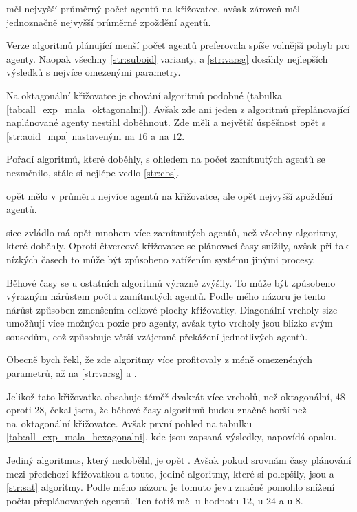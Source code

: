  měl nejvyšší průměrný počet agentů na křižovatce,
avšak zároveň měl jednoznačně nejvyšší průměrné zpoždění agentů.

Verze algoritmů plánující menší počet agentů preferovala spíše volnější pohyb pro agenty.
Naopak všechny \ref{str:suboid} varianty,  a \ref{str:varsg} dosáhly nejlepších výsledků s nejvíce omezenými parametry.



Na oktagonální křižovatce je chování algoritmů podobné (tabulka \ref{tab:all_exp_mala_oktagonalni}).
Avšak zde ani jeden z algoritmů přeplánovající naplánované agenty nestihl doběhnout.
Zde měli  a 
největší úspěšnost opět s \ref{str:aoid_mpa} nastaveným na $16$ a  na $12$.

Pořadí algoritmů, které doběhly, s ohledem na počet zamítnutých agentů se nezměnilo,
stále si nejlépe vedlo \ref{str:cbs}.

 opět mělo v průměru nejvíce agentů na křižovatce, ale opět nejvyšší zpoždění agentů.

 sice zvládlo má opět mnohem více zamítnutých agentů, než všechny algoritmy, které doběhly.
Oproti čtvercové křižovatce se plánovací časy snížily,
avšak při tak nízkých časech to může být způsobeno zatížením systému jinými procesy.

Běhové časy se u ostatních algoritmů výrazně zvýšily.
To může být způsobeno výrazným nárůstem počtu zamítnutých agentů.
Podle mého názoru je tento nárůst způsoben zmenšením celkové plochy křižovatky.
Diagonální vrcholy size umožňují více možných pozic pro agenty,
avšak tyto vrcholy jsou blízko svým sousedům, což způsobuje větší vzájemné překážení jednotlivých agentů.

Obecně bych řekl, že zde algoritmy více profitovaly z méně omezenéných parametrů,
až na \ref{str:varsg} a .



Jelikož tato křižovatka obsahuje téměř dvakrát více vrcholů, než oktagonální, $48$ oproti $28$, čekal jsem,
že běhové časy algoritmů budou značně horší než na~oktagonální křižovatce.
Avšak první pohled na tabulku \ref{tab:all_exp_mala_hexagonalni}, kde jsou zapsaná výsledky, napovídá opaku.

Jediný algoritmus, který nedoběhl, je opět .
Avšak pokud srovnám časy plánování mezi předchozí křižovatkou a touto, jediné algoritmy, které si polepšily,
jsou  a \ref{str:sat} algoritmy.
Podle mého názoru je tomuto jevu značně pomohlo snížení počtu přeplánovaných agentů.
Ten totiž měl u  hodnotu $12$,
u  $24$ a u  $8$.

